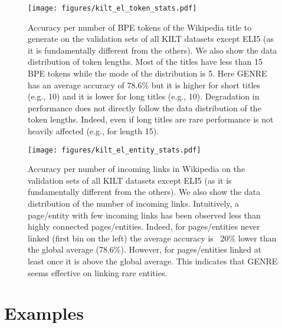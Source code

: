 \documentclass{article} \usepackage{main,times}
\makeatletter
\def\genre{\textsc{GENRE}\@\xspace}
\makeatother
\begin{document}
\begin{figure}[!ht]
    \centering
    \texttt{[image: figures/kilt\_el\_token\_stats.pdf]}
    \caption{Accuracy per number of BPE tokens of the Wikipedia title to generate on the validation sets of all KILT datasets except ELI5 (as it is fundamentally different from the others). We also show the data distribution of token lengths. Most of the titles have less than 15 BPE tokens while the mode of the distribution is 5. Here GENRE has an average accuracy of 78.6\% but it is higher for short titles (e.g., 10) and it is lower for long titles (e.g., 10). Degradation in performance does not directly follow the data distribution of the token lengths. Indeed, even if long titles are rare performance is not heavily affected (e.g., for length 15).}
    \label{fig:kilt_el_token_stats}
\end{figure}

\begin{figure}[!ht]
    \centering
    \texttt{[image: figures/kilt\_el\_entity\_stats.pdf]}
    \caption{Accuracy per number of incoming links in Wikipedia on the validation sets of all KILT datasets except ELI5 (as it is fundamentally different from the others). We also show the data distribution of the number of incoming links. Intuitively, a page/entity with few incoming links has been observed less than highly connected pages/entities. Indeed, for pages/entities never linked (first bin on the left) the average accuracy is ~20\% lower than the global average (78.6\%). However, for pages/entities linked at least once it is above the global average. This indicates that \genre seems effective on linking rare entities.}
    \label{fig:kilt_el_entity_stats}
\end{figure}

\newpage
\section{Examples} \label{app:examples}
\end{document}
